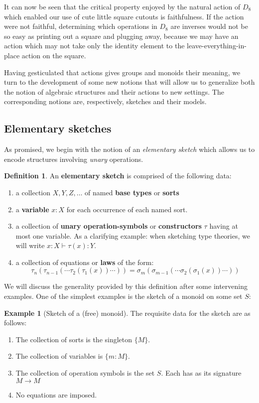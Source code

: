 \documentclass[12pt,twoside]{reedthesis}
\theoremstyle{definition}
\newtheorem{definition}{Definition}
\newtheorem{example}{Example}
\theoremstyle{remark}
\theoremstyle{theorem}
\begin{document}
It can now be seen that the critical property enjoyed by the natural action of
$D_{8}$ which enabled our use of cute little square cutouts is faithfulness. If
the action were not faithful, determining which operations in $D_{8}$ are
inverses would not be so easy as printing out a square and plugging away,
because we may have an action which may not take only the identity element to
the leave-everything-in-place action on the square.


Having gesticulated that actions gives groups and monoids their meaning, we turn
to the development of some new notions that will allow us to generalize both the
notion of algebraic structures and their actions to new
settings. %
The corresponding notions are, respectively, sketches and their models.

\subsection{Elementary sketches}
As promised, we begin with the notion of an \emph{elementary sketch} which
allows us to encode structures involving \emph{unary} operations.
\begin{definition}\label{def:elem sketch}
  An \textbf{elementary sketch} is comprised of the following data:
  \begin{enumerate}
    \item a collection \(X, Y, Z, \dots \) of named \textbf{base types} or
          \textbf{sorts}
    \item a \textbf{variable} \(x:X\) for each occurrence of each named sort.
    \item a collection of \textbf{unary operation-symbols} or
          \textbf{constructors} \(\tau\) having at most one variable. As a
          clarifying example: when sketching type theories, we will write
          \( x:X \vdash \tau(x) : Y \).
    \item a collection of equations or \textbf{laws} of the
          form: \[ \tau_n (\tau_{n-1}(\cdots \tau_2 (\tau_1 (x))\cdots )) = \sigma_m (\sigma_{m-1}(\cdots \sigma_2 (\sigma_1 (x))\cdots )) \]
  \end{enumerate}
\end{definition}
We will discuss the generality provided by this definition after some
intervening examples. One of the simplest examples is the sketch of a monoid on some set $S$:

\begin{example}[Sketch of a (free) monoid]\label{ex:monoid sketch}
  The requisite data for the sketch are as follows:
  \begin{enumerate}
    \item The collection of sorts is the singleton \( \{M\} \).
    \item The collection of variables is \( \{m:M\} \).
    \item The collection of operation symbols is the set \( S \). Each has as its signature \( M \rightarrow M \)
    \item No equations are imposed.
  \end{enumerate}
\end{example}
\end{document}

